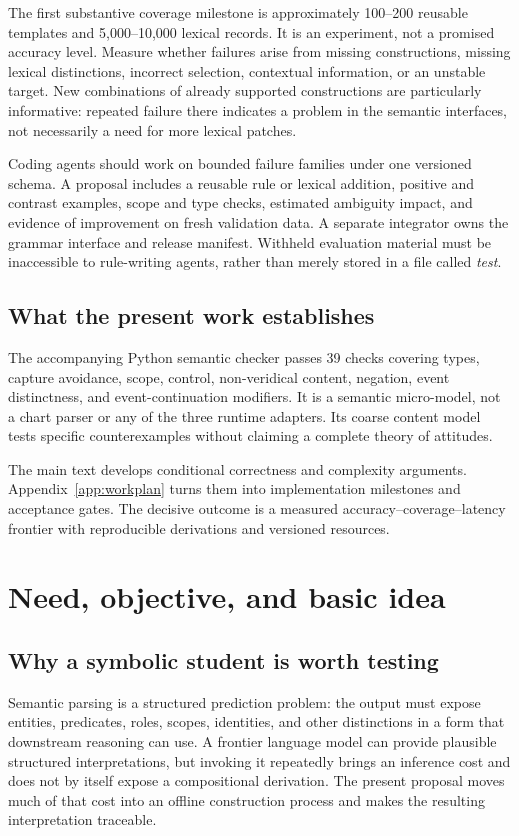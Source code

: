\documentclass[11pt,a4paper]{article}
\begin{document}
The first substantive coverage milestone is approximately 100--200 reusable
templates and 5,000--10,000 lexical records. It is an experiment, not a promised
accuracy level. Measure whether failures arise from missing constructions,
missing lexical distinctions, incorrect selection, contextual information, or
an unstable target. New combinations of already supported constructions are
particularly informative: repeated failure there indicates a problem in the
semantic interfaces, not necessarily a need for more lexical patches.

Coding agents should work on bounded failure families under one versioned
schema. A proposal includes a reusable rule or lexical addition, positive and
contrast examples, scope and type checks, estimated ambiguity impact, and
evidence of improvement on fresh validation data. A separate integrator owns
the grammar interface and release manifest. Withheld evaluation material must
be inaccessible to rule-writing agents, rather than merely stored in a file
called \emph{test}.

\subsection*{What the present work establishes}
The accompanying Python semantic checker passes 39 checks covering types,
capture avoidance, scope, control, non-veridical content, negation, event
distinctness, and event-continuation modifiers. It is a semantic micro-model,
not a chart parser or any of the three runtime adapters. Its coarse content model tests
specific counterexamples without claiming a complete theory of attitudes.

The main text develops conditional correctness and complexity arguments.
Appendix~\ref{app:workplan} turns them into implementation milestones and
acceptance gates. The decisive outcome is a measured
accuracy--coverage--latency frontier with reproducible derivations and
versioned resources.

\clearpage
\begingroup
\small
\setlength{\parskip}{0pt}
\tableofcontents
\endgroup
\clearpage

\section{Need, objective, and basic idea}\label{sec:motivation}

\subsection{Why a symbolic student is worth testing}
Semantic parsing is a structured prediction problem: the output must expose
entities, predicates, roles, scopes, identities, and other distinctions in a
form that downstream reasoning can use. A frontier language model can provide
plausible structured interpretations, but invoking it repeatedly brings an
inference cost and does not by itself expose a compositional derivation.
The present proposal moves much of that cost into an offline construction
process and makes the resulting interpretation traceable.
\end{document}
